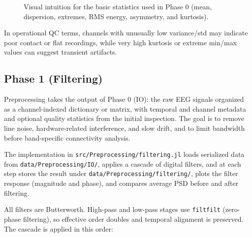 \begin{fullwidth}
\begin{figure}[H]
{
}
\caption{Visual intuition for the basic statistics used in Phase 0 (mean, dispersion, extremes, RMS energy, asymmetry, and kurtosis).}
\end{figure}
\end{fullwidth}
In operational QC terms, channels with unusually low variance/std may indicate poor contact or flat recordings, while very high kurtosis or extreme min/max values can suggest transient artifacts.

\subsection{Phase 1 (Filtering)}

Preprocessing takes the output of Phase 0 (IO): the raw EEG signals organized as a channel-indexed dictionary or matrix, with temporal and channel metadata and optional quality statistics from the initial inspection. The goal is to remove line noise, hardware-related interference, and slow drift, and to limit bandwidth before band-specific connectivity analysis.

The implementation in \texttt{src/Preprocessing/filtering.jl} loads serialized data from \texttt{data/Preprocessing/IO/}, applies a cascade of digital filters, and at each step stores the result under \texttt{data/Preprocessing/filtering/}, plots the filter response (magnitude and phase), and compares average PSD before and after filtering.

All filters are Butterworth. High-pass and low-pass stages use \texttt{filtfilt} (zero-phase filtering), so effective order doubles and temporal alignment is preserved. The cascade is applied in this order:

